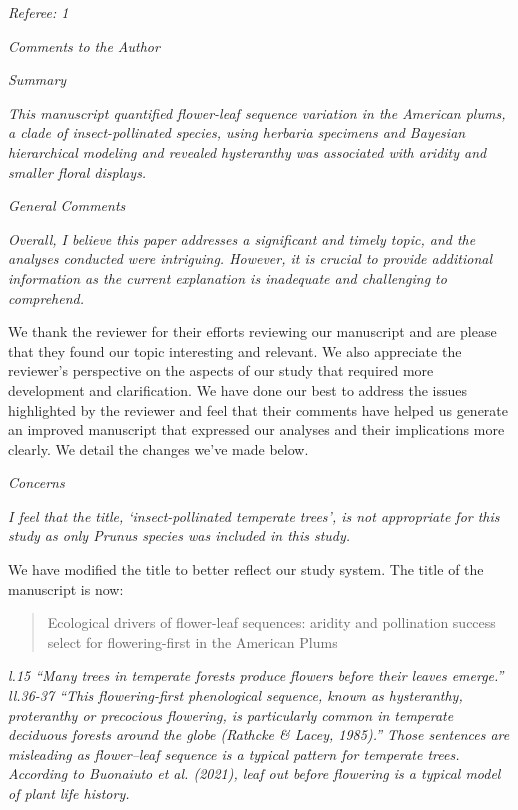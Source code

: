 \documentclass{article}[12pt]
\begin{document}


\emph{Referee: 1}

\emph{Comments to the Author}

\emph{Summary}

\emph{This manuscript quantified flower-leaf sequence variation in the American plums, a clade of insect-pollinated species, using herbaria specimens and Bayesian hierarchical modeling and revealed hysteranthy was associated with aridity and smaller floral displays.}

\emph{General Comments}

\emph{Overall, I believe this paper addresses a significant and timely topic, and the analyses conducted were intriguing. However, it is crucial to provide additional information as the current explanation is inadequate and challenging to comprehend.}

We thank the reviewer for their efforts reviewing our manuscript and are please that they found our topic interesting and relevant. We also appreciate the reviewer's perspective on the aspects of our study that required more development and clarification. We have done our best to address the issues highlighted by the reviewer and feel that their comments have helped us generate an improved manuscript that expressed our analyses and their implications more clearly. We detail the changes we've made below.

\emph{Concerns}

\emph{I feel that the title, ‘insect-pollinated temperate trees’, is not appropriate for this study as only Prunus species was included in this study.}

We have modified the title to better reflect our study system. The title of the manuscript is now: 
\begin{quote}Ecological drivers of flower-leaf sequences: aridity and pollination success select for flowering-first in the American Plums \end{quote}

\emph{l.15 “Many trees in temperate forests produce flowers before their leaves emerge.”
ll.36-37 “This flowering-first phenological sequence, known as hysteranthy, proteranthy or precocious flowering, is particularly common in temperate deciduous forests around the globe (Rathcke & Lacey, 1985).”
Those sentences are misleading as flower–leaf sequence is a typical pattern for temperate trees. According to Buonaiuto et al. (2021), leaf out before flowering is a typical model of plant life history.}
\end{document}
